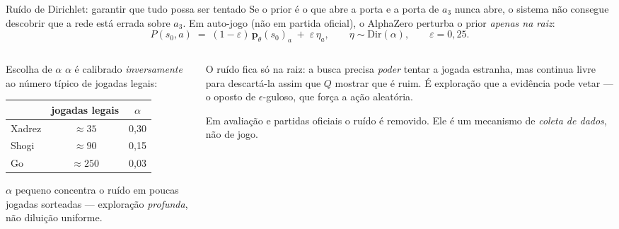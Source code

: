 \documentclass[aspectratio=169, 10pt]{beamer}
\newcommand{\redepol}{\bm{p}_{\theta}}
\begin{document}
\begin{frame}{Ruído de Dirichlet: garantir que tudo possa ser tentado}
  \footnotesize
  Se o prior é o que abre a porta e a porta de $a_3$ nunca abre, o sistema não
  consegue descobrir que a rede está errada sobre $a_3$. Em \alert{auto-jogo}
  (não em partida oficial), o AlphaZero perturba o prior \emph{apenas na raiz}:
  \[
    P(s_0,a) \;=\; (1-\varepsilon)\,\redepol(s_0)_a \;+\; \varepsilon\,\eta_a,
    \qquad \eta \sim \mathrm{Dir}(\alpha),\qquad \varepsilon = 0{,}25 .
  \]

  \begin{columns}[T]
    \begin{column}{0.5\textwidth}
      \begin{defbox}{Escolha de $\alpha$}
        $\alpha$ é calibrado \emph{inversamente} ao número típico de jogadas
        legais:
        \smallskip
        \begin{center}\small
        \begin{tabular}{lcc}
          \toprule
          & jogadas legais & $\alpha$ \\ \midrule
          Xadrez & $\approx 35$  & 0,30 \\
          Shogi  & $\approx 90$  & 0,15 \\
          Go     & $\approx 250$ & 0,03 \\
          \bottomrule
        \end{tabular}
        \end{center}
        \smallskip
        $\alpha$ pequeno concentra o ruído em poucas jogadas sorteadas —
        exploração \emph{profunda}, não diluição uniforme.
      \end{defbox}
    \end{column}
    \begin{column}{0.48\textwidth}
      \begin{ideiabox}
        O ruído fica só na raiz: a busca precisa \emph{poder} tentar a jogada
        estranha, mas continua livre para descartá-la assim que $Q$ mostrar que é
        ruim. É exploração que a evidência pode vetar — o oposto de
        $\epsilon$-guloso, que força a ação aleatória.
      \end{ideiabox}
      \begin{alertabox}
        Em avaliação e partidas oficiais o ruído é removido. Ele é um mecanismo de
        \emph{coleta de dados}, não de jogo.
      \end{alertabox}
    \end{column}
  \end{columns}
\end{frame}
\end{document}

